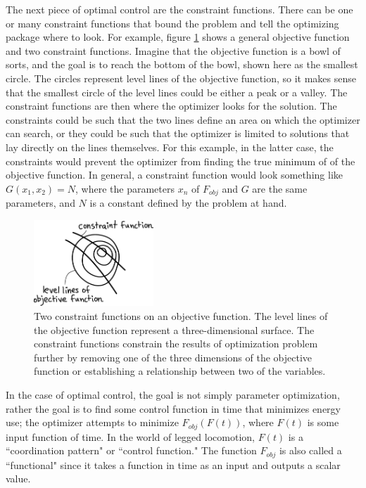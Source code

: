 The next piece of optimal control are the constraint functions. There can be one or many constraint functions that bound the problem and tell the optimizing package where to look. For example, figure \ref{fig:ObjectiveFunction} shows a general objective function and two constraint functions. Imagine that the objective function is a bowl of sorts, and the goal is to reach the bottom of the bowl, shown here as the smallest circle. The circles represent level lines of the objective function, so it makes sense that the smallest circle of the level lines could be either a peak or a valley. The constraint functions are then where the optimizer looks for the solution. The constraints could be such that the two lines define an area on which the optimizer can search, or they could be such that the optimizer is limited to solutions that lay directly on the lines themselves. For this example, in the latter case, the constraints would prevent the optimizer from finding the true minimum of of the objective function. In general, a constraint function would look something like $G(x_{1},x_{2}) = N$, where the parameters $x_{n}$ of $F_{obj}$ and $G$ are the same parameters, and $N$ is a constant defined by the problem at hand. 

\begin{figure}[h]		%
\begin{centering}
\includegraphics[width=0.4\textwidth]{Figures/ObjectiveFunction}\par
\end{centering}
\caption[Diagram: Objective Functions and Constraint Functions]{Two constraint functions on an objective function. The level lines of the objective function represent a three-dimensional surface. The constraint functions constrain the results of optimization problem further by removing one of the three dimensions of the objective function or establishing a relationship between two of the variables.}
\label{fig:ObjectiveFunction}
\end{figure}
%

In the case of optimal control, the goal is not simply parameter optimization, rather the goal is to find some control function in time that minimizes energy use; the optimizer attempts to minimize $F_{obj}(F(t))$, where $F(t)$ is some input function of time. In the world of legged locomotion, $F(t)$ is a ``coordination pattern" or ``control function." The function $F_{obj}$ is also called a ``functional" since it takes a function in time as an input and outputs a scalar value. 

